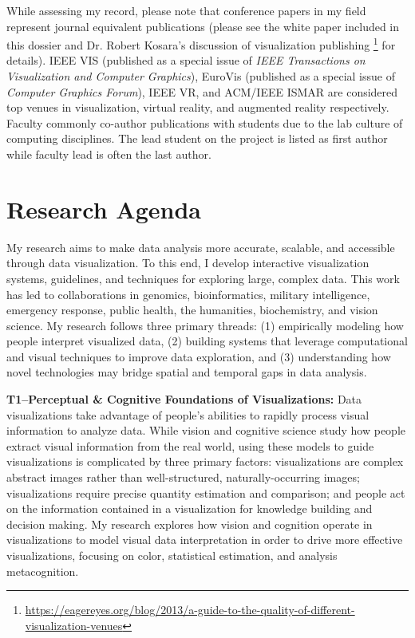 \documentclass[11pt]{article}
\begin{document}
While assessing my record, please note that conference papers in my field represent journal equivalent publications (please see the white paper included in this dossier and Dr. Robert Kosara's discussion of visualization publishing \footnote{\url{https://eagereyes.org/blog/2013/a-guide-to-the-quality-of-different-visualization-venues}} for details). IEEE VIS (published as a special issue of \emph{IEEE Transactions on Visualization and Computer Graphics}), EuroVis (published as a special issue of \emph{Computer Graphics Forum}), IEEE VR, and ACM/IEEE ISMAR are considered top venues in visualization, virtual reality, and augmented reality respectively. Faculty commonly co-author publications with students due to the lab culture of computing disciplines. The lead student on the project is listed as first author while faculty lead is often the last author. 




\section*{Research Agenda}
My research aims to make data analysis more accurate, scalable, and accessible through data visualization. To this end, I develop interactive visualization systems, guidelines, and techniques for exploring large, complex data. This work has led to collaborations in genomics, bioinformatics, military intelligence, emergency response, public health, the humanities, biochemistry, and vision science. My research follows three primary threads: (1) empirically modeling how people interpret visualized data, (2) building systems that leverage computational and visual techniques to improve data exploration, and (3) understanding how novel technologies may bridge spatial and temporal gaps in data analysis. 

\textbf{T1--Perceptual \& Cognitive Foundations of Visualizations: }
Data visualizations take advantage of people's abilities to rapidly process visual information to analyze data. While vision and cognitive science study how people extract visual information from the real world, using these models to guide visualizations is complicated by three primary factors: visualizations are complex abstract images rather than well-structured, naturally-occurring images; visualizations require precise quantity estimation and comparison; and people act on the information contained in a visualization for knowledge building and decision making. My research explores how vision and cognition operate in visualizations to model visual data interpretation in order to drive more effective visualizations, focusing on color, statistical estimation, and analysis metacognition. 
\end{document}

